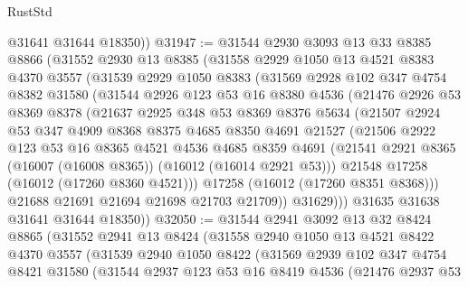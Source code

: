 \begin{lexlean}{RustStd}
\begin{coremodule}
        @31641
        @31644
        @18350))
@31947 := @31544
    @2930
    @3093
    @13
    @33
    @8385
    @8866
    (@31552
      @2930
      @13
      @8385
      (@31558
        @2929
        @1050
        @13
        @4521
        @8383
        @4370
        @3557
        (@31539
          @2929
          @1050
          @8383
          (@31569
            @2928
            @102
            @347
            @4754
            @8382
            @31580
            (@31544
              @2926
              @123
              @53
              @16
              @8380
              @4536
              (@21476
                @2926
                @53
                @8369
                @8378
                (@21637
                  @2925
                  @348
                  @53
                  @8369
                  @8376
                  @5634
                  (@21507
                    @2924
                    @53
                    @347
                    @4909
                    @8368
                    @8375
                    @4685
                    @8350
                    @4691
                    @21527
                    (@21506
                      @2922
                      @123
                      @53
                      @16
                      @8365
                      @4521
                      @4536
                      @4685
                      @8359
                      @4691
                      (@21541 @2921 @8365 (@16007 (@16008 @8365)) (@16012 (@16014 @2921 @53)))
                      @21548
                      @17258
                      (@16012 (@17260 @8360 @4521)))
                    @17258
                    (@16012 (@17260 @8351 @8368)))
                  @21688
                  @21691
                  @21694
                  @21698
                  @21703
                  @21709))
              @31629)))
        @31635
        @31638
        @31641
        @31644
        @18350))
@32050 := @31544
    @2941
    @3092
    @13
    @32
    @8424
    @8865
    (@31552
      @2941
      @13
      @8424
      (@31558
        @2940
        @1050
        @13
        @4521
        @8422
        @4370
        @3557
        (@31539
          @2940
          @1050
          @8422
          (@31569
            @2939
            @102
            @347
            @4754
            @8421
            @31580
            (@31544
              @2937
              @123
              @53
              @16
              @8419
              @4536
              (@21476
                @2937
                @53

\end{coremodule}
\end{lexlean}
